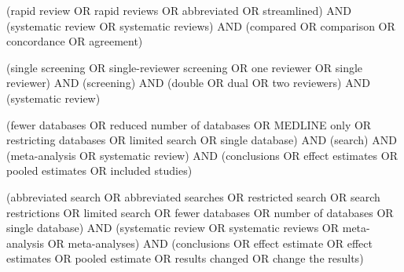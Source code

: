 \begin{description}[style=nextline,font=\normalfont\bfseries]
\item[q2a, support query] {\footnotesize\ttfamily\raggedright (\textquotedbl{}rapid review\textquotedbl{} OR \textquotedbl{}rapid reviews\textquotedbl{} OR abbreviated OR streamlined) AND (\textquotedbl{}systematic review\textquotedbl{} OR \textquotedbl{}systematic reviews\textquotedbl{}) AND (compared OR comparison OR concordance OR agreement)\par}
\item[q2b, support query] {\footnotesize\ttfamily\raggedright (\textquotedbl{}single screening\textquotedbl{} OR \textquotedbl{}single-reviewer screening\textquotedbl{} OR \textquotedbl{}one reviewer\textquotedbl{} OR \textquotedbl{}single reviewer\textquotedbl{}) AND (screening) AND (double OR dual OR \textquotedbl{}two reviewers\textquotedbl{}) AND (\textquotedbl{}systematic review\textquotedbl{})\par}
\item[q2c, support query] {\footnotesize\ttfamily\raggedright (\textquotedbl{}fewer databases\textquotedbl{} OR \textquotedbl{}reduced number of databases\textquotedbl{} OR \textquotedbl{}MEDLINE only\textquotedbl{} OR \textquotedbl{}restricting databases\textquotedbl{} OR \textquotedbl{}limited search\textquotedbl{} OR \textquotedbl{}single database\textquotedbl{}) AND (search) AND (\textquotedbl{}meta-analysis\textquotedbl{} OR \textquotedbl{}systematic review\textquotedbl{}) AND (conclusions OR \textquotedbl{}effect estimates\textquotedbl{} OR \textquotedbl{}pooled estimates\textquotedbl{} OR \textquotedbl{}included studies\textquotedbl{})\par}
\item[q2d, support query] {\footnotesize\ttfamily\raggedright (\textquotedbl{}abbreviated search\textquotedbl{} OR \textquotedbl{}abbreviated searches\textquotedbl{} OR \textquotedbl{}restricted search\textquotedbl{} OR \textquotedbl{}search restrictions\textquotedbl{} OR \textquotedbl{}limited search\textquotedbl{} OR \textquotedbl{}fewer databases\textquotedbl{} OR \textquotedbl{}number of databases\textquotedbl{} OR \textquotedbl{}single database\textquotedbl{}) AND (\textquotedbl{}systematic review\textquotedbl{} OR \textquotedbl{}systematic reviews\textquotedbl{} OR \textquotedbl{}meta-analysis\textquotedbl{} OR \textquotedbl{}meta-analyses\textquotedbl{}) AND (conclusions OR \textquotedbl{}effect estimate\textquotedbl{} OR \textquotedbl{}effect estimates\textquotedbl{} OR \textquotedbl{}pooled estimate\textquotedbl{} OR \textquotedbl{}results changed\textquotedbl{} OR \textquotedbl{}change the results\textquotedbl{})\par}

\end{description}
